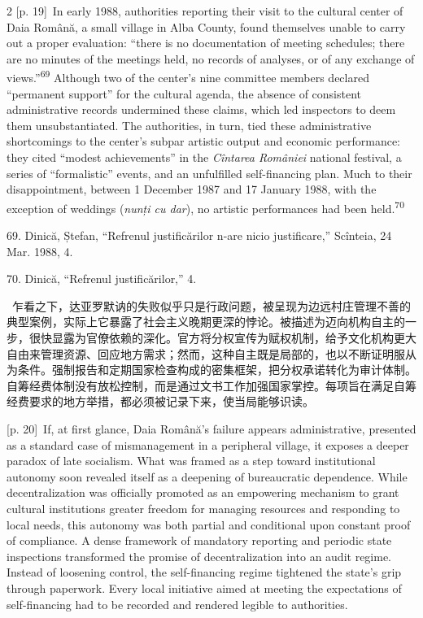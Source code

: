 \documentclass[10pt,a4paper]{article}
\begin{document}
\begin{paracol}{2}
{\scriptsize\color{gray} [p. 19]}\ In early 1988, authorities reporting their visit to the cultural center of Daia Română, a small village in Alba County, found themselves unable to carry out a proper evaluation: “there is no documentation of meeting schedules; there are no minutes of the meetings held, no records of analyses, or of any exchange of views.”\nobreak\textsuperscript{69} Although two of the center’s nine committee members declared “permanent support” for the cultural agenda, the absence of consistent administrative records undermined these claims, which led inspectors to deem them unsubstantiated. The authorities, in turn, tied these administrative shortcomings to the center’s subpar artistic output and economic performance: they cited “modest achievements” in the \textit{Cîntarea României} national festival, a series of “formalistic” events, and an unfulfilled self-financing plan. Much to their disappointment, between 1 December 1987 and 17 January 1988, with the exception of weddings (\textit{nunți cu dar}), no artistic performances had been held.\nobreak\textsuperscript{70}\par{\small 69. Dinică, Ștefan, “Refrenul justificărilor n-are nicio justificare,” Scînteia, 24 Mar. 1988, 4.\par}{\small 70. Dinică, “Refrenul justificărilor,” 4.\par}
\switchcolumn*
{\scriptsize\color{gray} [p. 20]}\ 乍看之下，达亚罗默讷的失败似乎只是行政问题，被呈现为边远村庄管理不善的典型案例，实际上它暴露了社会主义晚期更深的悖论。被描述为迈向机构自主的一步，很快显露为官僚依赖的深化。官方将分权宣传为赋权机制，给予文化机构更大自由来管理资源、回应地方需求；然而，这种自主既是局部的，也以不断证明服从为条件。强制报告和定期国家检查构成的密集框架，把分权承诺转化为审计体制。自筹经费体制没有放松控制，而是通过文书工作加强国家掌控。每项旨在满足自筹经费要求的地方举措，都必须被记录下来，使当局能够识读。\par
\switchcolumn
{\scriptsize\color{gray} [p. 20]}\ If, at first glance, Daia Română’s failure appears administrative, presented as a standard case of mismanagement in a peripheral village, it exposes a deeper paradox of late socialism. What was framed as a step toward institutional autonomy soon revealed itself as a deepening of bureaucratic dependence. While decentralization was officially promoted as an empowering mechanism to grant cultural institutions greater freedom for managing resources and responding to local needs, this autonomy was both partial and conditional upon constant proof of compliance. A dense framework of mandatory reporting and periodic state inspections transformed the promise of decentralization into an audit regime. Instead of loosening control, the self-financing regime tightened the state’s grip through paperwork. Every local initiative aimed at meeting the expectations of self-financing had to be recorded and rendered legible to authorities.\par

\end{paracol}
\end{document}
